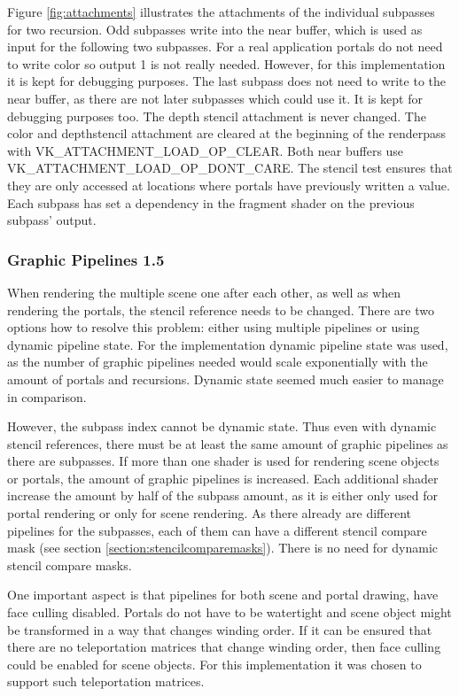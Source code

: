 Figure \ref{fig:attachments} illustrates the attachments of the individual subpasses for two recursion. Odd subpasses write into the near buffer, which is used as input for the following two subpasses. For a real application portals do not need to write color so output 1 is not really needed. However, for this implementation it is kept for debugging purposes.
The last subpass does not need to write to the near buffer, as there are not later subpasses which could use it. It is kept for debugging purposes too. The depth stencil attachment is never changed. The color and depthstencil attachment are cleared at the beginning of the renderpass with VK\_ATTACHMENT\_LOAD\_OP\_CLEAR. Both near buffers use VK\_ATTACHMENT\_LOAD\_OP\_DONT\_CARE. The stencil test ensures that they are only accessed at locations where portals have previously written a value. Each subpass has set a dependency in the fragment shader on the previous subpass' output.


\subsubsection{Graphic Pipelines 1.5}
When rendering the multiple scene one after each other, as well as when rendering the portals, the stencil reference needs to be changed. There are two options how to resolve this problem: either using multiple pipelines or using dynamic pipeline state. For the implementation dynamic pipeline state was used, as the number of graphic pipelines needed would scale exponentially with the amount of portals and recursions. Dynamic state seemed much easier to manage in comparison.

However, the subpass index cannot be dynamic state. Thus even with dynamic stencil references, there must be at least the same amount of graphic pipelines as there are subpasses. If more than one shader is used for rendering scene objects or portals, the amount of graphic pipelines is increased. Each additional shader increase the amount by half of the subpass amount, as it is either only used for portal rendering or only for scene rendering. As there already are different pipelines for the subpasses, each of them can have a different stencil compare mask (see section \ref{section:stencilcomparemasks}). There is no need for dynamic stencil compare masks.

One important aspect is that pipelines for both scene and portal drawing, have face culling disabled. Portals do not have to be watertight and scene object might be transformed in a way that changes winding order. If it can be ensured that there are no teleportation matrices that change winding order, then face culling could be enabled for scene objects. For this implementation it was chosen to support such teleportation matrices.

